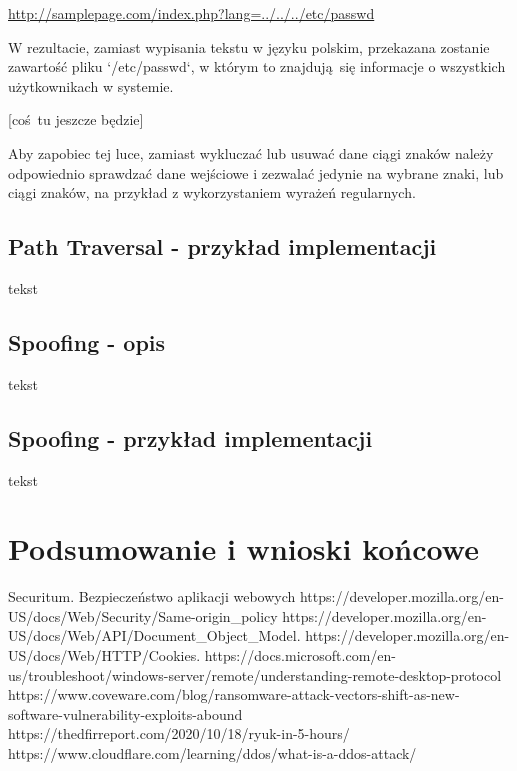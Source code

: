 \documentclass[12pt,twoside]{article}
\begin{document}
\url{http://samplepage.com/index.php?lang=../../../etc/passwd}

W rezultacie, zamiast wypisania tekstu w języku polskim, przekazana zostanie zawartość pliku `/etc/passwd`, w którym to znajdują się informacje o wszystkich użytkownikach w systemie.

[coś tu jeszcze będzie]

Aby zapobiec tej luce, zamiast wykluczać lub usuwać dane ciągi znaków należy odpowiednio sprawdzać dane wejściowe i zezwalać jedynie na wybrane znaki, lub ciągi znaków, na przykład z wykorzystaniem wyrażeń regularnych. 

\subsection{Path Traversal - przykład implementacji}
tekst
\subsection{Spoofing - opis}
tekst
\subsection{Spoofing - przykład implementacji}
tekst
\clearpage
\section{Podsumowanie i wnioski końcowe}



\clearpage


\begin{thebibliography}{4}
 Securitum. Bezpieczeństwo aplikacji webowych
 https://developer.mozilla.org/en-US/docs/Web/Security/Same-origin{\_}policy
 https://developer.mozilla.org/en-US/docs/Web/API/Document{\_}Object{\_}Model. 
 https://developer.mozilla.org/en-US/docs/Web/HTTP/Cookies. 
 https://docs.microsoft.com/en-us/troubleshoot/windows-server/remote/understanding-remote-desktop-protocol
 https://www.coveware.com/blog/ransomware-attack-vectors-shift-as-new-software-vulnerability-exploits-abound
 https://thedfirreport.com/2020/10/18/ryuk-in-5-hours/
 https://www.cloudflare.com/learning/ddos/what-is-a-ddos-attack/

\end{thebibliography}

\clearpage

\makesummary
\end{document}
